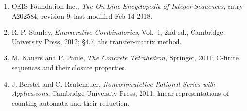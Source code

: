 \documentclass[11pt]{article}
\theoremstyle{definition}
\begin{document}
\begin{enumerate}

\item OEIS Foundation Inc., \emph{The On-Line Encyclopedia of Integer Sequences}, entry \href{https://oeis.org/A202584}{A202584}, revision 9, last modified Feb 14 2018.

\item R. P. Stanley, \emph{Enumerative Combinatorics}, Vol.~1, 2nd ed., Cambridge University Press, 2012; \S4.7, the transfer-matrix method.

\item M. Kauers and P. Paule, \emph{The Concrete Tetrahedron}, Springer, 2011; C-finite sequences and their closure properties.

\item J. Berstel and C. Reutenauer, \emph{Noncommutative Rational Series with Applications}, Cambridge University Press, 2011; linear representations of counting automata and their reduction.

\end{enumerate}
\end{document}

